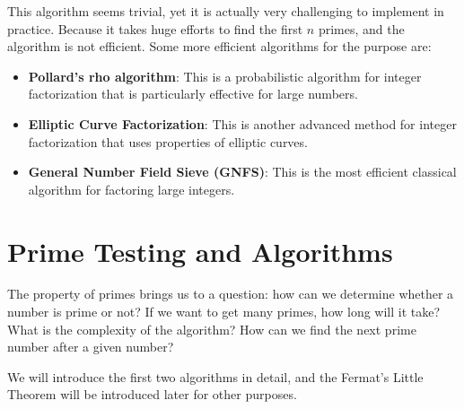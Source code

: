 \documentclass[oneside]{book}
\begin{document}
This algorithm seems trivial, yet it is actually very challenging to implement in practice. Because it takes huge efforts to find the first $n$ primes, and the algorithm is not efficient. Some more efficient algorithms for the purpose are:
\begin{itemize}
	\item \textbf{Pollard's rho algorithm}: This is a probabilistic algorithm for integer factorization that is particularly effective for large numbers.
	\item \textbf{Elliptic Curve Factorization}: This is another advanced method for integer factorization that uses properties of elliptic curves.
	\item \textbf{General Number Field Sieve (GNFS)}: This is the most efficient classical algorithm for factoring large integers.
\end{itemize}

\section{Prime Testing and Algorithms}
The property of primes brings us to a question: how can we determine whether a number is prime or not? If we want to get many primes, how long will it take? What is the complexity of the algorithm? How can we find the next prime number after a given number?

We will introduce the first two algorithms in detail, and the Fermat's Little Theorem will be introduced later for other purposes.
\end{document}
